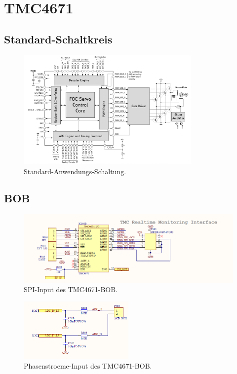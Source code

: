 \section{TMC4671}\label{Appendix:TMC4671}

\subsection{Standard-Schaltkreis}\label{Appendix:Schaltung_TMC4671}

\begin{figure}[H]
	\centering
	\includegraphics[width=0.8\textwidth]{graphics/Standard_Application_Cirquit_TMC4671}
	\caption{Standard-Anwendungs-Schaltung.}
	\label{fig:Schaltung_TMC4671}
\end{figure}

\subsection{BOB}\label{Appendix:BOB}

\begin{figure}[H]
	\centering
	\includegraphics[width=\textwidth]{graphics/TMC4671_SPI_BOB_Schematic}
	\caption{SPI-Input des TMC4671-BOB.}
	\label{fig:Schema_SPI_FOC_Treiber}
\end{figure} 

\begin{figure}[H]
	\centering
	\includegraphics[width=0.5\textwidth]{graphics/TMC4671_Phasenstroeme_BOB_Schematic}
	\caption{Phasenstroeme-Input des TMC4671-BOB.}
	\label{fig:Schema_Phasenstroeme_FOC_Treiber}
\end{figure} 


